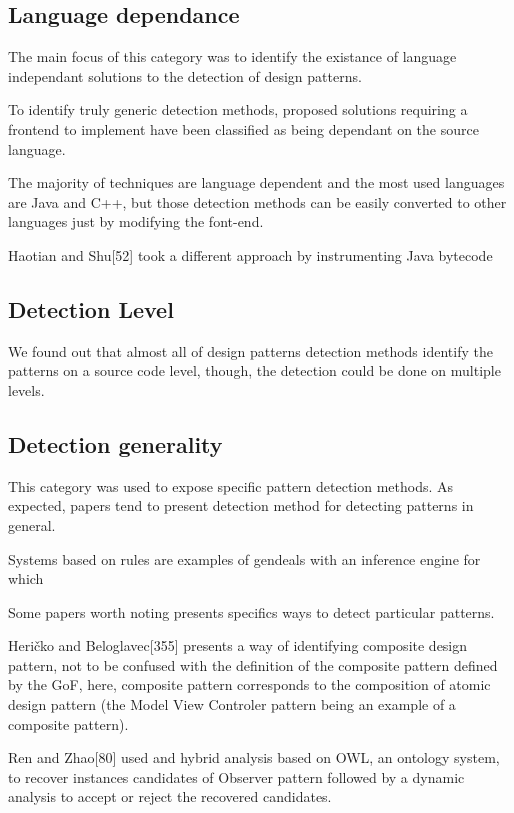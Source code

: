 \documentclass[letterpaper, 10 pt, conference]{ieeeconf}  %
\begin{document}
\subsection{Language dependance}
The main focus of this category was to identify the existance of language
independant solutions to the detection of design patterns.

To identify truly generic detection methods, proposed solutions requiring a
frontend to implement have been classified as being dependant on the source
language. 

The majority of techniques are language dependent and the most used 
languages are Java and C++, but those detection methods can be easily converted to other languages
just by modifying the font-end.

Haotian and Shu[52] took a different approach by instrumenting Java bytecode


\subsection{Detection Level}
We found out that almost all of design patterns detection methods 
identify the patterns on a source code level, though, the detection could
be done on multiple levels.


\subsection{Detection generality}

This category was used to expose specific pattern detection methods.
As expected, papers tend to present detection method for detecting patterns
in general.

Systems based on rules are examples of gendeals with an inference engine for which


Some papers worth noting presents specifics ways to detect particular patterns.

Heričko and Beloglavec[355] presents a way of identifying
composite design pattern, not to be confused with the definition of the 
composite pattern defined by the GoF, here, composite pattern corresponds to the
composition of atomic design pattern (the Model View Controler pattern being an
example of a composite pattern).

Ren and Zhao[80] used and hybrid analysis based on OWL, an ontology system,
to recover instances candidates of Observer pattern followed by a dynamic
analysis to accept or reject the recovered candidates.
\end{document}
